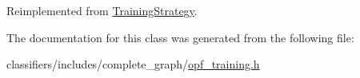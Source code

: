 Reimplemented from \hyperlink{classTrainingStrategy_a6f32e0ab0330bafb029022e7ca605cbe}{Training\+Strategy}.



The documentation for this class was generated from the following file\+:\begin{DoxyCompactItemize}
\item 
classifiers/includes/complete\+\_\+graph/\hyperlink{opf__training_8h}{opf\+\_\+training.\+h}\end{DoxyCompactItemize}
